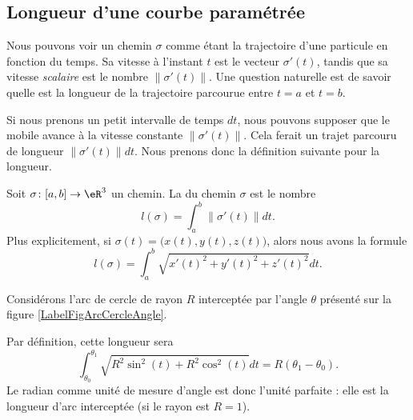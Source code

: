 \subsection{Longueur d'une courbe paramétrée}

Nous pouvons voir un chemin $\sigma$ comme étant la trajectoire d'une particule en fonction du temps. Sa vitesse à l'instant $t$ est le vecteur $\sigma'(t)$, tandis que sa vitesse \emph{scalaire} est le nombre $\| \sigma'(t) \|$. Une question naturelle est de savoir quelle est la longueur de la trajectoire parcourue entre $t=a$ et $t=b$.

Si nous prenons un petit intervalle de temps $dt$, nous pouvons supposer que le mobile avance à la vitesse constante $\| \sigma'(t) \|$. Cela ferait un trajet parcouru de longueur $\| \sigma'(t) \|dt$. Nous prenons donc la définition suivante pour la longueur.

\begin{definition}
    Soit $\sigma\colon \mathopen[ a , b \mathclose]\to \eR^3$ un chemin. La  du chemin $\sigma$ est le nombre
    \begin{equation}        \label{EqDefLongueurChemin}
        l(\sigma)=\int_a^b\| \sigma'(t) \|dt.
    \end{equation}
    Plus explicitement, si $\sigma(t)=\big( x(t),y(t),z(t) \big)$, alors nous avons la formule
    \begin{equation}
        l(\sigma)=\int_a^b\sqrt{x'(t)^2+y'(t)^2+z'(t)^2}dt.
    \end{equation}
\end{definition}

\begin{example}
    Considérons l'arc de cercle de rayon $R$ interceptée par l'angle $\theta$ présenté sur la figure \ref{LabelFigArcCercleAngle}.
    \newcommand{\CaptionFigArcCercleAngle}{Quelle est la longueur de la partie bleue de ce cercle de rayon $R$ ?}
    

    Par définition, cette longueur sera
    \begin{equation}
        \int_{\theta_0}^{\theta_1}\sqrt{R^2\sin^2(t)+R^2\cos^2(t)}dt=R(\theta_1-\theta_0).
    \end{equation}
    Le radian comme unité de mesure d'angle est donc l'unité parfaite : elle est la longueur d'arc interceptée (si le rayon est $R=1$).

\end{example}

